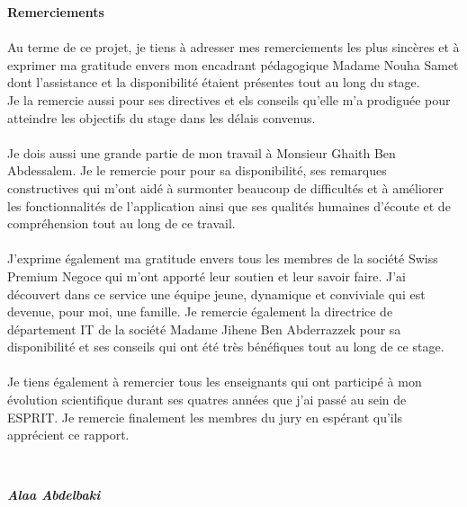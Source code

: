 \thispagestyle{plain}
\begin{center}
    \begin{huge}
        \textbf{Remerciements}
    \end{huge}
\end{center}
\vspace{2cm}
\begin{small}
    \justifying
    \paragraph{}
    \noindent Au terme de ce projet, je tiens à adresser mes remerciements les plus sincères et à exprimer ma gratitude envers mon encadrant pédagogique Madame Nouha Samet dont l'assistance et la disponibilité étaient présentes tout au long du stage.\\
    \noindent Je la remercie aussi pour ses directives et els conseils qu'elle m'a prodiguée pour atteindre les objectifs du stage dans les délais convenus.
    \paragraph{}
    \noindent Je dois aussi une grande partie de mon travail à Monsieur Ghaith Ben Abdessalem. Je le remercie pour pour sa disponibilité, ses remarques constructives qui m'ont aidé à surmonter beaucoup de difficultés et à améliorer les fonctionnalités de l'application ainsi que ses qualités humaines d'écoute et de compréhension tout au long de ce travail.
    \paragraph{}
    \noindent J'exprime également ma gratitude envers tous les membres de la société Swiss Premium Negoce qui m'ont apporté leur soutien et leur savoir faire. J'ai découvert dans ce service une équipe jeune, dynamique et conviviale qui est devenue, pour moi, une famille. Je remercie également la directrice de département IT de la société Madame Jihene Ben Abderrazzek pour sa disponibilité et ses conseils qui ont été très bénéfiques tout au long de ce stage.
    \paragraph{}
    Je tiens également à remercier tous les enseignants qui ont participé à mon évolution scientifique durant ses quatres années que j'ai passé au sein de ESPRIT. Je remercie finalement les membres du jury en espérant qu'ils apprécient ce rapport.
\end{small} \\
\bigbreak
\begin{flushright}
    \textbf{\textit{Alaa Abdelbaki}}
\end{flushright}